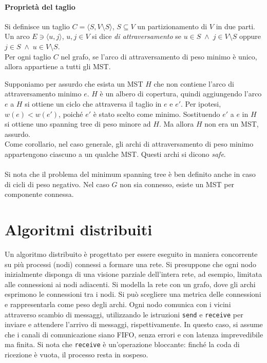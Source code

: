 \documentclass[target=bach,aauheader=,style=]{thud}
\newcommand{\eng}[1]{\foreignlanguage{english}{#1}}
\begin{document}
\paragraph{Proprietà del taglio}\label{mst:cut}
Si definisce un taglio $C=\langle S,V\setminus S\rangle$, $S\subseteq V$ un partizionamento di $V$ in due parti. Un arco $E\ni\langle u,j\rangle$, $u,j\in V$ si dice \emph{di attraversamento} se $u\in S\;\land\;j\in V\setminus S$ oppure $j\in S\;\land\;u\in V\setminus S$.\\
Per ogni taglio $C$ nel grafo, se l'arco di attraversamento di peso minimo è unico, allora appartiene a tutti gli MST.

Supponiamo per assurdo che esista un MST $H$ che non contiene l'arco di attraversamento minimo $e$. $H$ è un albero di copertura, quindi aggiungendo l'arco $e$ a $H$ si ottiene un ciclo che attraversa il taglio in $e$ e $e'$. Per ipotesi, $w(e)<w(e')$, poiché $e'$ è stato scelto come minimo. Sostituendo $e'$ a $e$ in $H$ si ottiene uno \eng{spanning tree} di peso minore ad $H$. Ma allora $H$ non era un MST, assurdo.\\
Come corollario, nel caso generale, gli archi di attraversamento di peso minimo appartengono ciascuno a un qualche MST. Questi archi si dicono \emph{\eng{safe}}.

\paragraph{}
Si nota che il problema del \eng{minimum spanning tree} è ben definito anche in caso di cicli di peso negativo.
Nel caso $G$ non sia connesso, esiste un MST per componente connessa. 

\section{Algoritmi distribuiti}
Un algoritmo distribuito è progettato per essere eseguito in maniera concorrente su più processi (nodi) connessi a formare una rete. Si presuppone che ogni nodo inizialmente disponga di una visione parziale dell'intera rete, ad esempio, limitata alle connessioni ai nodi adiacenti. Si modella la rete con un grafo, dove gli archi esprimono le connessioni tra i nodi. Si può scegliere una metrica delle connessioni e rappresentarla come peso degli archi. Ogni nodo comunica con i vicini attraverso scambio di messaggi, utilizzando le istruzioni \lstinline{send} e \lstinline{receive} per inviare e attendere l'arrivo di messaggi, rispettivamente. In questo caso, si assume che i canali di comunicazione siano FIFO, senza errori e con latenza imprevedibile ma finita. Si nota che \lstinline{receive} è un'operazione bloccante: finché la coda di ricezione è vuota, il processo resta in sospeso.
\end{document}
